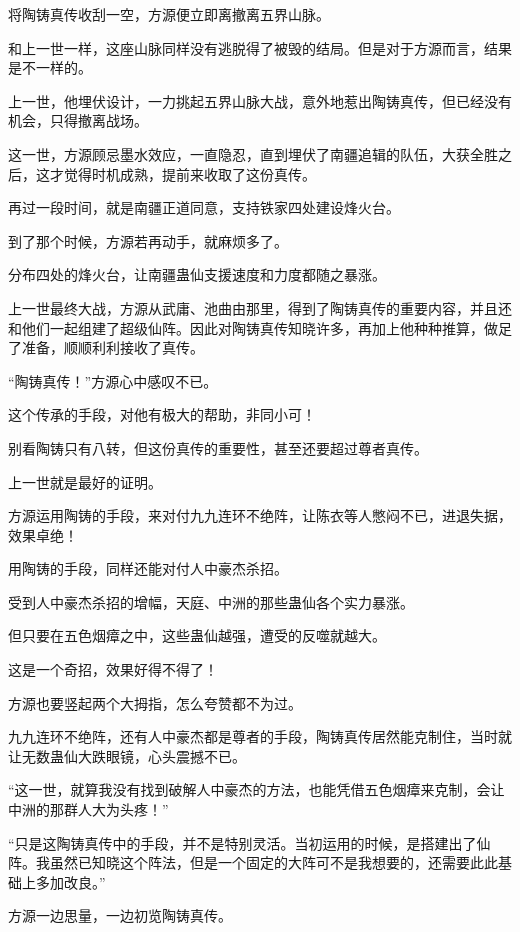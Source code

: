 
\begin{this_body}

将陶铸真传收刮一空，方源便立即离撤离五界山脉。

和上一世一样，这座山脉同样没有逃脱得了被毁的结局。但是对于方源而言，结果是不一样的。

上一世，他埋伏设计，一力挑起五界山脉大战，意外地惹出陶铸真传，但已经没有机会，只得撤离战场。

这一世，方源顾忌墨水效应，一直隐忍，直到埋伏了南疆追辑的队伍，大获全胜之后，这才觉得时机成熟，提前来收取了这份真传。

再过一段时间，就是南疆正道同意，支持铁家四处建设烽火台。

到了那个时候，方源若再动手，就麻烦多了。

分布四处的烽火台，让南疆蛊仙支援速度和力度都随之暴涨。

上一世最终大战，方源从武庸、池曲由那里，得到了陶铸真传的重要内容，并且还和他们一起组建了超级仙阵。因此对陶铸真传知晓许多，再加上他种种推算，做足了准备，顺顺利利接收了真传。

“陶铸真传！”方源心中感叹不已。

这个传承的手段，对他有极大的帮助，非同小可！

别看陶铸只有八转，但这份真传的重要性，甚至还要超过尊者真传。

上一世就是最好的证明。

方源运用陶铸的手段，来对付九九连环不绝阵，让陈衣等人憋闷不已，进退失据，效果卓绝！

用陶铸的手段，同样还能对付人中豪杰杀招。

受到人中豪杰杀招的增幅，天庭、中洲的那些蛊仙各个实力暴涨。

但只要在五色烟瘴之中，这些蛊仙越强，遭受的反噬就越大。

这是一个奇招，效果好得不得了！

方源也要竖起两个大拇指，怎么夸赞都不为过。

九九连环不绝阵，还有人中豪杰都是尊者的手段，陶铸真传居然能克制住，当时就让无数蛊仙大跌眼镜，心头震撼不已。

“这一世，就算我没有找到破解人中豪杰的方法，也能凭借五色烟瘴来克制，会让中洲的那群人大为头疼！”

“只是这陶铸真传中的手段，并不是特别灵活。当初运用的时候，是搭建出了仙阵。我虽然已知晓这个阵法，但是一个固定的大阵可不是我想要的，还需要此此基础上多加改良。”

方源一边思量，一边初览陶铸真传。


\end{this_body}

